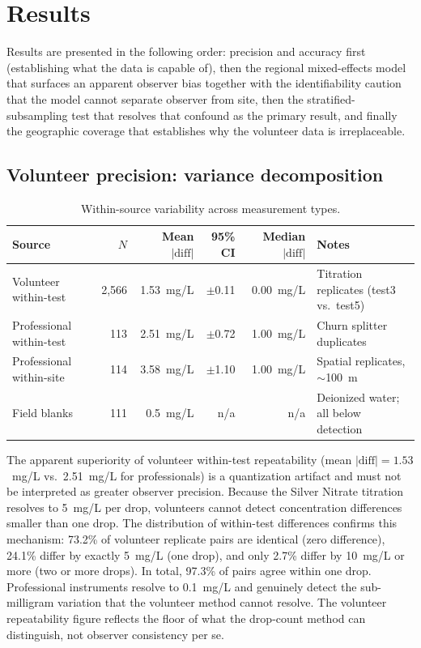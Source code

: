 \documentclass[lineno]{wlpeerj}
\begin{document}
\section{Results}

Results are presented in the following order: precision and accuracy first (establishing what the data is capable of), then the regional mixed-effects model that surfaces an apparent observer bias together with the identifiability caution that the model cannot separate observer from site, then the stratified-subsampling test that resolves that confound as the primary result, and finally the geographic coverage that establishes why the volunteer data is irreplaceable.

\subsection{Volunteer precision: variance decomposition}
\label{sec:precision}

\begin{table}[ht]
\centering
\caption{Within-source variability across measurement types.}
\label{tab:variance}
\begin{tabular}{p{3cm} r r r r p{3.5cm}}
\toprule
Source & $N$ & Mean $|\mathrm{diff}|$ & 95\% CI & Median $|\mathrm{diff}|$ & Notes \\
\midrule
Volunteer within-test & 2,566 & 1.53~mg/L & $\pm$0.11 & 0.00~mg/L & Titration replicates (test3 vs.\ test5) \\
Professional within-test & 113 & 2.51~mg/L & $\pm$0.72 & 1.00~mg/L & Churn splitter duplicates \\
Professional within-site & 114 & 3.58~mg/L & $\pm$1.10 & 1.00~mg/L & Spatial replicates, $\sim$100~m \\
Field blanks & 111 & 0.5~mg/L & n/a & n/a & Deionized water; all below detection \\
\bottomrule
\end{tabular}
\end{table}

The apparent superiority of volunteer within-test repeatability (mean $|\mathrm{diff}| = 1.53$~mg/L vs.\ 2.51~mg/L for professionals) is a quantization artifact and must not be interpreted as greater observer precision. Because the Silver Nitrate titration resolves to 5~mg/L per drop, volunteers cannot detect concentration differences smaller than one drop. The distribution of within-test differences confirms this mechanism: 73.2\% of volunteer replicate pairs are identical (zero difference), 24.1\% differ by exactly 5~mg/L (one drop), and only 2.7\% differ by 10~mg/L or more (two or more drops). In total, 97.3\% of pairs agree within one drop. Professional instruments resolve to 0.1~mg/L and genuinely detect the sub-milligram variation that the volunteer method cannot resolve. The volunteer repeatability figure reflects the floor of what the drop-count method can distinguish, not observer consistency per se.
\end{document}
